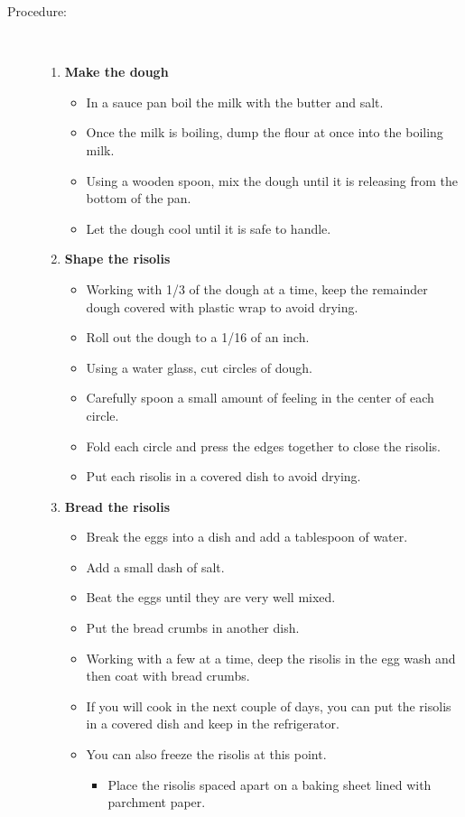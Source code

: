 \documentclass[11pt,letterpaper]{article}
\begin{document}
\begin{description}
\item[Procedure:]\ \\
	\begin{enumerate}
	\item {\bf Make the dough}
	\begin{itemize}
	\item In a sauce pan boil the milk with the butter and salt.
        \item Once the milk is boiling, dump the flour at once into the boiling milk.
	\item Using a wooden spoon, mix the dough until it is releasing from the bottom of the pan.
	\item Let the dough cool until it is safe to handle.
	\end{itemize}
	\item {\bf Shape the risolis}
	\begin{itemize}
	\item Working with 1/3 of the dough at a time, keep the remainder dough covered with plastic wrap to avoid drying.
	\item Roll out the dough to a 1/16 of an inch.
	\item Using a water glass, cut circles of dough.
	\item Carefully spoon a small amount of feeling in the center of each circle.
	\item Fold each circle and press the edges together to close the risolis.
	\item Put each risolis in a covered dish to avoid drying.
	\end{itemize}
	\item {\bf Bread the risolis}
	\begin{itemize}
	\item Break the eggs into a dish and add a tablespoon of water.
	\item Add a small dash of salt.
	\item Beat the eggs until they are very well mixed.
	\item Put the bread crumbs in another dish.
	\item Working with a few at a time, deep the risolis in the egg wash and then coat with bread crumbs.
	\item If you will cook in the next couple of days, you can put the risolis in a covered dish and keep in the refrigerator.
	\item You can also freeze the risolis at this point. 
		\begin{itemize}
		\item Place the risolis spaced apart on a baking sheet lined with parchment paper.

\end{itemize}
\end{itemize}
\end{enumerate}
\end{description}
\end{document}
